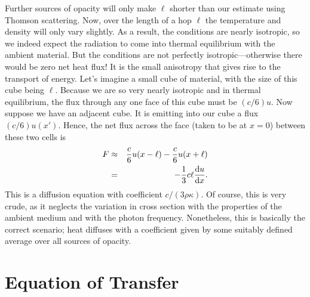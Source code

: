 Further sources of opacity will only make $\ell$ shorter than our estimate using Thomson scattering.  Now, over the length of a hop $\ell$ the temperature and density will only vary slightly.  As a result, the conditions are nearly isotropic, so we indeed expect the radiation to come into thermal equilibrium with the ambient material.  But the conditions are not perfectly isotropic---otherwise there would be zero net heat flux!  It is the small anisotropy that gives rise to the transport of energy.  Let's imagine a small cube of material, with the size of this cube being $\ell$.  Because we are so very nearly isotropic and in thermal equilibrium, the flux through any one face of this cube must be $(c/6)u$.  Now suppose we have an adjacent cube. It is emitting into our cube a flux $(c/6) u(x')$.  Hence, the net flux across the face (taken to be at $x=0$) between these two cells is
\begin{eqnarray}
	F &\approx& \frac{c}{6} u(x-\ell) - \frac{c}{6} u (x+\ell)\nonumber \\
	&=& -\frac{1}{3}c\ell\frac{\mathrm{d} u}{\mathrm{d} x}.\label{e.rad-diffusion-simple}
\end{eqnarray}
This is a diffusion equation with coefficient $c/(3\rho\kappa)$.  Of course, this is very crude, as it neglects the variation in cross section with the properties of the ambient medium and with the photon frequency.  Nonetheless, this is basically the correct scenario; heat diffuses with a coefficient given by some suitably defined average over all sources of opacity. 

\section{Equation of Transfer}

